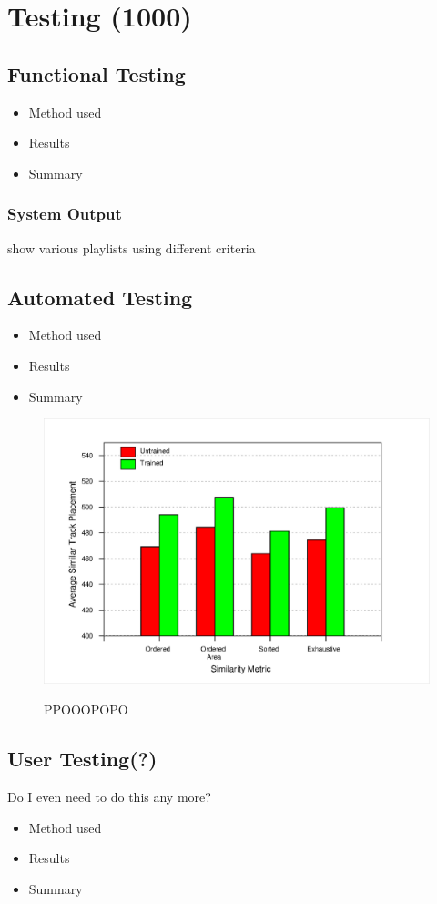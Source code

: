 \chapter{Testing (1000)}
\section{Functional Testing}
\begin{itemize}
	\item Method used
	\item Results
	\item Summary
\end{itemize}
\subsection{System Output}
show various playlists using different criteria
\section{Automated Testing}
\begin{itemize}
	\item Method used
	\item Results
	\item Summary
\end{itemize}
\begin{figure}[hp]
	\caption{PPOOOPOPO}
	\includegraphics[width=\textwidth]{testing/graphs/comparison-metric-trained-untrained}
	\label{graph:trained-untrained}
\end{figure}
\section{User Testing(?)}
Do I even need to do this any more?
\begin{itemize}
	\item Method used
	\item Results
	\item Summary
\end{itemize}
